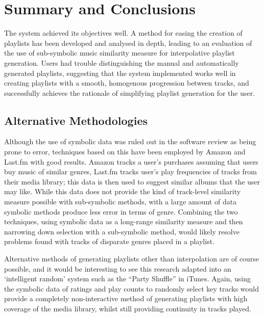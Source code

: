 \chapter{Summary and Conclusions}
\begin{comment}
	\item Implications for policy and practice
	\item Recommendations for action
\note{why mine's great and why others are better}
\end{comment}
The system achieved its objectives well. A method for easing the creation of playlists has been developed and analysed in depth, leading to an evaluation of the use of sub-symbolic music similarity measure for interpolative playlist generation. Users had trouble distinguishing the manual and automatically generated playlists, suggesting that the system implemented works well in creating playlists with a smooth, homogenous progression between tracks, and successfully achieves the rationale of simplifying playlist generation for the user.
\section{Alternative Methodologies}
Although the use of symbolic data was ruled out in the software review as being prone to error, techniques based on this have been employed by Amazon and Last.fm with good results. Amazon tracks a user's purchases assuming that users buy music of similar genres, Last.fm tracks user's play frequencies of tracks from their media library; this data is then used to suggest similar albums that the user may like. While this data does not provide the kind of track-level similarity measure possible with sub-symbolic methods, with a large amount of data symbolic methods produce less error in terms of genre. Combining the two techniques, using symbolic data as a long-range similarity measure and then narrowing down selection with a sub-symbolic method, would likely resolve problems found with tracks of disparate genres placed in a playlist.

Alternative methods of generating playlists other than interpolation are of course possible, and it would be interesting to see this research adapted into an `intelligent random' system such as the ``Party Shuffle'' in iTunes. Again, using the symbolic data of ratings and play counts to randomly select key tracks would provide a completely non-interactive method of generating playlists with high coverage of the media library, whilst still providing continuity in tracks played.
